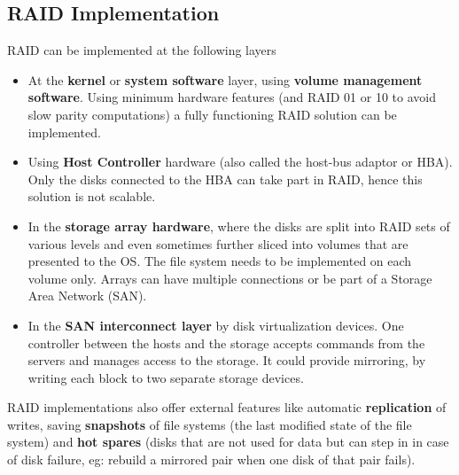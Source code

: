 \documentclass{article}
\theoremstyle{plain}
\theoremstyle{definition}
\begin{document}
\subsection{RAID Implementation}
RAID can be implemented at the following layers
\begin{itemize}
    \item At the \textbf{kernel} or \textbf{system software} layer, using \textbf{volume management software}. Using minimum hardware features (and RAID 01 or 10 to avoid slow parity computations) a fully functioning RAID solution can be implemented.
    
    \item Using \textbf{Host Controller} hardware (also called the host-bus adaptor or HBA). Only the disks connected to the HBA can take part in RAID, hence this solution is not scalable. 
    
    \item In the \textbf{storage array hardware}, where the disks are split into RAID sets of various levels and even sometimes further sliced into volumes that are presented to the OS. The file system needs to be implemented on each volume only. Arrays can have multiple connections or be part of a Storage Area Network (SAN).
    
    \item In the \textbf{SAN interconnect layer} by disk virtualization devices. One controller between the hosts and the storage accepts commands from the servers and manages access to the storage. It could provide mirroring, by writing each block to two separate storage devices.

\end{itemize}

RAID implementations also offer external features like automatic \textbf{replication} of writes, saving \textbf{snapshots} of file systems (the last modified state of the file system) and \textbf{hot spares} (disks that are not used for data but can step in in case of disk failure, eg: rebuild a mirrored pair when one disk of that pair fails).
\end{document}
